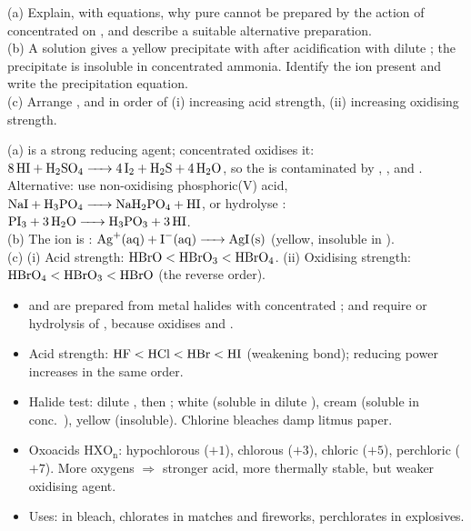 \documentclass[11pt]{article}
\begin{document}
\begin{exercice}
(a) Explain, with equations, why pure  cannot be prepared by the action of concentrated  on , and describe a suitable alternative preparation.\\
(b) A solution gives a yellow precipitate with  after acidification with dilute ; the precipitate is insoluble in concentrated ammonia. Identify the ion present and write the precipitation equation.\\
(c) Arrange ,  and  in order of (i) increasing acid strength, (ii) increasing oxidising strength.
\end{exercice}

\begin{corrige}[Exercise 1]
(a)  is a strong reducing agent; concentrated  oxidises it: $\ce{8HI + H2SO4 -> 4I2 + H2S + 4H2O}$, so the  is contaminated by , ,  and . Alternative: use non-oxidising phosphoric(V) acid, $\ce{NaI + H3PO4 -> NaH2PO4 + HI}$, or hydrolyse : $\ce{PI3 + 3H2O -> H3PO3 + 3HI}$.\\
(b) The ion is : $\ce{Ag+(aq) + I-(aq) -> AgI(s)}$ (yellow, insoluble in ).\\
(c) (i) Acid strength: $\ce{HBrO} < \ce{HBrO3} < \ce{HBrO4}$. (ii) Oxidising strength: $\ce{HBrO4} < \ce{HBrO3} < \ce{HBrO}$ (the reverse order).
\end{corrige}

\begin{aretenir}
\begin{itemize}
\item {} and  are prepared from metal halides with concentrated ;  and  require  or hydrolysis of , because  oxidises  and .
\item Acid strength: $\ce{HF} < \ce{HCl} < \ce{HBr} < \ce{HI}$ (weakening  bond); reducing power increases in the same order.
\item Halide test: dilute , then ;  white (soluble in dilute ),  cream (soluble in conc.\ ),  yellow (insoluble). Chlorine bleaches damp litmus paper.
\item Oxoacids \ensuremath{\mathrm{HXO_{n}}}: hypochlorous ($+1$), chlorous ($+3$), chloric ($+5$), perchloric ($+7$). More oxygens $\Rightarrow$ stronger acid, more thermally stable, but weaker oxidising agent.
\item Uses:  in bleach, chlorates in matches and fireworks, perchlorates in explosives.
\end{itemize}
\end{aretenir}
\end{document}
